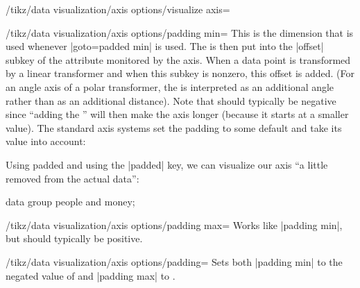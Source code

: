 \begin{key}{/tikz/data visualization/axis options/visualize axis=}
  \begin{key}{/tikz/data visualization/axis options/padding min=}
    This is the dimension that is used whenever |goto=padded min| is
    used. The  is then put into the |offset| subkey of
    the attribute monitored by the axis. When a data point is
    transformed by a linear transformer and when this subkey is
    nonzero, this offset is added. (For an angle axis of a polar
    transformer, the  is interpreted as an additional
    angle rather than as an additional distance). Note that
     should typically be negative since 
    ``adding the '' will then make the axis longer
    (because it starts at a smaller value). The standard
    axis systems set the padding to some default and take its value
    into account: 
\begin{codeexample}[width=8cm]
\end{codeexample}

  Using padded and using the |padded| key, we can visualize our axis
  ``a little removed from the actual data'':
\begin{codeexample}[]
\tikz \datavisualization [
    our system,
    x axis={attribute=time, length=3cm},
    left axis ={attribute=money},
    right axis={attribute=people},
    visualize as line/.list={people 1, people 2, money 1, money 2}]
  data group {people and money};  
\end{codeexample}  
  \end{key}

  \begin{key}{/tikz/data visualization/axis options/padding max=}
    Works like |padding min|, but  should typically be positive.
  \end{key}
  
  \begin{key}{/tikz/data visualization/axis options/padding=}
    Sets both |padding min| to the negated value of  and
    |padding max| to .
  \end{key}
\end{key}




